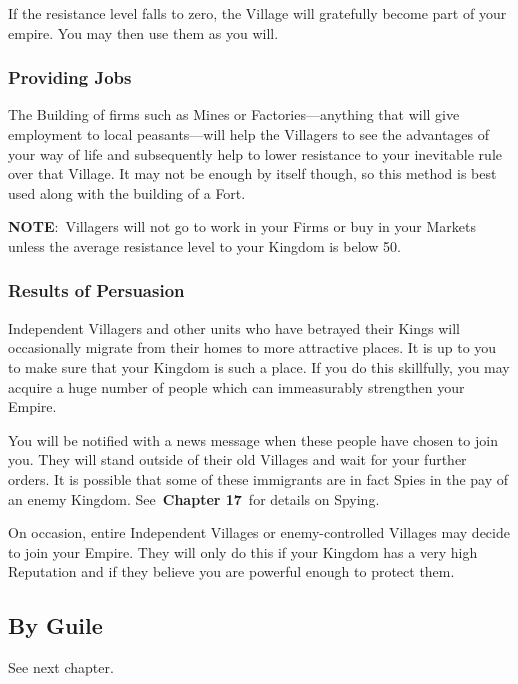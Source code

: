 If the resistance level falls to zero, the Village will gratefully become part of your empire. You may then use them as you will.

\subsubsection{Providing Jobs}

The Building of firms such as Mines or Factories---anything that will give employment to local peasants---will help the Villagers to see the advantages of your way of life and subsequently help to lower resistance to your inevitable rule over that Village. It may not be enough by itself though, so this method is best used along with the building of a Fort.

\textbf{NOTE}: Villagers will not go to work in your Firms or buy in your Markets unless the average resistance level to your Kingdom is below 50. 

\subsubsection{Results of Persuasion}

Independent Villagers and other units who have betrayed their Kings will occasionally migrate from their homes to more attractive places. It is up to you to make sure that your Kingdom is such a place. If you do this skillfully, you may acquire a huge number of people which can immeasurably strengthen your Empire.

You will be notified with a news message when these people have chosen to join you. They will stand outside of their old Villages and wait for your further orders. It is possible that some of these immigrants are in fact Spies in the pay of an enemy Kingdom. See \textbf{Chapter 17} for details on Spying.

On occasion, entire Independent Villages or enemy-controlled Villages may decide to join your Empire. They will only do this if your Kingdom has a very high Reputation and if they believe you are powerful enough to protect them.

\subsection{By Guile}

See next chapter.